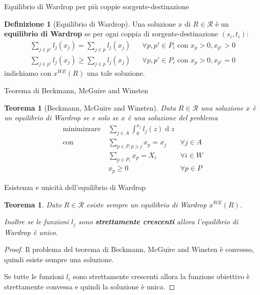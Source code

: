 \documentclass{beamer}
\newcounter{counter1}
\theoremstyle{plain}
\newtheorem{myteo}[counter1]{Teorema}
\theoremstyle{definition}
\newtheorem{mydef}[counter1]{Definizione}
\theoremstyle{remark}
\DeclareMathOperator{\de}{d}
\begin{document}
\begin{frame}{Equilibrio di Wardrop per più coppie sorgente-destinazione}
  \begin{mydef}[Equilibrio di Wardrop]
    Una soluzione $x$ di $R\in \mathcal{R}$ è un \textbf{equilibrio di
      Wardrop} se per ogni coppia di sorgente-destinazione
    $(s_i,t_i)$:
    \begin{align*}
      \sum _{j\in p'} l_j(x_j) = \sum _{j\in p} l_j(x_j) & & \forall
                                                             p,p'\in P_i \text{ con } x_p >0, x_{p'} >0 \\
      \sum _{j\in p'} l_j(x_j) \ge \sum _{j\in p} l_j(x_j) & & \forall
                                                               p,p'\in P_i \text{ con } x_p >0, x_{p'} =0 
    \end{align*}
    indichiamo con $x^{WE}(R)$ una tale soluzione.
  \end{mydef}  
\end{frame}

\begin{frame}{Teorema di Beckmann, McGuire and Winsten}
  \begin{myteo}[Beckmann, McGuire and Winsten]
    Data $R\in \mathcal{R}$ una soluzione $x$ è un equilibrio di
    Wardrop se e solo se $x$ è una soluzione del problema
    \begin{align*}
        \text{minimizzare} \;&  \sum _{j\in A} \int _0 ^ {x_j}
        l_j(z)\de z \\
        \text{con} \;& \sum _{p\in P, p\ni j} x_p = x_j&\forall j\in
        A\\
        & \sum _{p\in P_i} x_p = X_i& \forall i\in W\\
        & x_p \ge 0&\forall p\in P        
    \end{align*}
  \end{myteo}
\end{frame}


\begin{frame}{Esistenza e unicità dell'equilibrio di Wardrop}
  \begin{myteo}
    Dato $R\in \mathcal{R}$ esiste sempre un equilibrio di Wardrop
    $x^{WE}(R)$.

    Inoltre se le funzioni $l_j$ sono \textbf{strettamente crescenti}
    allora l'equilibrio di Wardrop è unico.
  \end{myteo}
  \begin{proof}
    Il problema del teorema di Beckmann, McGuire and Winsten è
    convesso, quindi esiste sempre una soluzione.

    Se tutte le funzioni $l_i$ sono strettamente crescenti allora la
    funzione obiettivo è strettamente convessa e quindi la soluzione è
    unica.
  \end{proof}
\end{frame}
\end{document}
